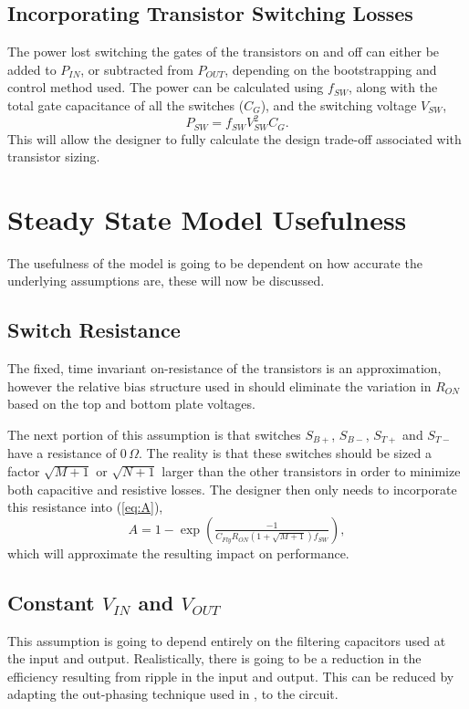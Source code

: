 \documentclass[conference]{IEEEtran}
\begin{document}
 	\subsection{Incorporating Transistor Switching Losses}
 	The power lost switching the gates of the transistors on and off can either be added to $P_{IN}$, or subtracted from $P_{OUT}$, depending on the bootstrapping and control method used. The power can be calculated using $f_{SW}$, along with the total gate capacitance of all the switches ($C_{G}$), and the switching voltage $V_{SW}$,
 	\begin{equation}
 	P_{SW} = f_{SW}V_{SW}^2C_G.
 	\end{equation}
 	This will allow the designer to fully calculate the design trade-off associated with transistor sizing. 
 	
 	
 	\section{Steady State Model Usefulness}
 	The usefulness of the model is going to be dependent on how accurate the underlying assumptions are, these will now be discussed. 
 	\subsection{Switch Resistance}
 	The fixed, time invariant on-resistance of the transistors is an approximation, however the relative bias structure used in \cite{Butzen2019} should eliminate the variation in $R_{ON}$ based on the top and bottom plate voltages.
 	
 	The next portion of this assumption is that switches $S_{B+}$, $S_{B-}$, $S_{T+}$ and $S_{T-}$ have a resistance of 0$\,\Omega$. The reality is that these switches should be sized a factor $\sqrt{M+1}$ or $\sqrt{N+1}$ larger than the other transistors in order to minimize both capacitive and resistive losses. The designer then only needs to incorporate this resistance into (\ref{eq:A}), 
 	\begin{equation}
 	A = 1-\exp\left(\tfrac{-1}{C_{Fly}R_{ON}(1+\sqrt{M+1}) f_{SW}}\right),
 	\end{equation}
 	which will approximate the resulting impact on performance.
 	\subsection{Constant $V_{IN}$ and $V_{OUT}$}
 	This assumption is going to depend entirely on the filtering capacitors used at the input and output. Realistically, there is going to be a reduction in the efficiency resulting from ripple in the input and output. This can be reduced by adapting the out-phasing technique used in \cite{Le2010}, to the circuit.
 	
\end{document}
